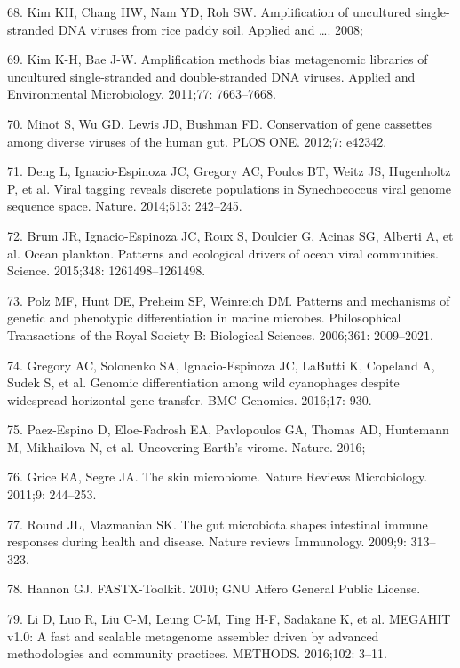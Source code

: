 \documentclass[12pt,]{article}
\begin{document}
\hypertarget{ref-Kim:2008to}{}
68. Kim KH, Chang HW, Nam YD, Roh SW. Amplification of uncultured
single-stranded DNA viruses from rice paddy soil. Applied and \ldots{}.
2008;

\hypertarget{ref-Kim:2011hp}{}
69. Kim K-H, Bae J-W. Amplification methods bias metagenomic libraries
of uncultured single-stranded and double-stranded DNA viruses. Applied
and Environmental Microbiology. 2011;77: 7663--7668.

\hypertarget{ref-Minot:2012ed}{}
70. Minot S, Wu GD, Lewis JD, Bushman FD. Conservation of gene cassettes
among diverse viruses of the human gut. PLOS ONE. 2012;7: e42342.

\hypertarget{ref-Deng:2014eb}{}
71. Deng L, Ignacio-Espinoza JC, Gregory AC, Poulos BT, Weitz JS,
Hugenholtz P, et al. Viral tagging reveals discrete populations in
Synechococcus viral genome sequence space. Nature. 2014;513: 242--245.

\hypertarget{ref-Brum:2015iaa}{}
72. Brum JR, Ignacio-Espinoza JC, Roux S, Doulcier G, Acinas SG, Alberti
A, et al. Ocean plankton. Patterns and ecological drivers of ocean viral
communities. Science. 2015;348: 1261498--1261498.

\hypertarget{ref-Polz:2006fi}{}
73. Polz MF, Hunt DE, Preheim SP, Weinreich DM. Patterns and mechanisms
of genetic and phenotypic differentiation in marine microbes.
Philosophical Transactions of the Royal Society B: Biological Sciences.
2006;361: 2009--2021.

\hypertarget{ref-Gregory:2016cg}{}
74. Gregory AC, Solonenko SA, Ignacio-Espinoza JC, LaButti K, Copeland
A, Sudek S, et al. Genomic differentiation among wild cyanophages
despite widespread horizontal gene transfer. BMC Genomics. 2016;17: 930.

\hypertarget{ref-PaezEspino:2016gi}{}
75. Paez-Espino D, Eloe-Fadrosh EA, Pavlopoulos GA, Thomas AD, Huntemann
M, Mikhailova N, et al. Uncovering Earth's virome. Nature. 2016;

\hypertarget{ref-Grice:2011gy}{}
76. Grice EA, Segre JA. The skin microbiome. Nature Reviews
Microbiology. 2011;9: 244--253.

\hypertarget{ref-Round:2009bz}{}
77. Round JL, Mazmanian SK. The gut microbiota shapes intestinal immune
responses during health and disease. Nature reviews Immunology. 2009;9:
313--323.

\hypertarget{ref-FASTXToolkit:wr}{}
78. Hannon GJ. FASTX-Toolkit. 2010; GNU Affero General Public License.

\hypertarget{ref-Li:2016kd}{}
79. Li D, Luo R, Liu C-M, Leung C-M, Ting H-F, Sadakane K, et al.
MEGAHIT v1.0: A fast and scalable metagenome assembler driven by
advanced methodologies and community practices. METHODS. 2016;102:
3--11.
\end{document}
